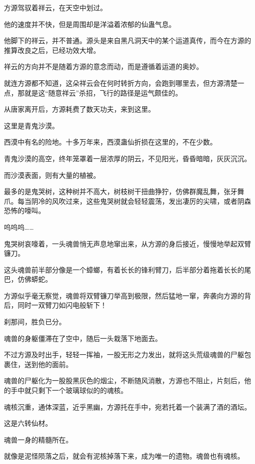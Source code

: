 
\begin{this_body}

方源驾驭着祥云，在天空中划过。

他的速度并不快，但是周围却是洋溢着浓郁的仙蛊气息。

他脚下的祥云，并不普通。源头是来自黑凡洞天中的某个运道真传，而今在方源的推算改良之后，已经功效大增。

祥云的方向并不是随着方源的意念而动，而是遵循着运道的奥妙。

就连方源都不知道，这朵祥云会在何时转折方向，会跑到哪里去，但方源清楚一点，那就是这“随意祥云”杀招，飞行的路径是运气颇佳的。

从唐家离开后，方源耗费了数天功夫，来到这里。

这里是青鬼沙漠。

西漠中有名的险地。十多万年来，西漠蛊仙折损在这里的，不在少数。

青鬼沙漠的高空，终年笼罩着一层浓厚的阴云，不见阳光，昏昏暗暗，灰灰沉沉。

而沙漠表面，则有大量的植被。

最多的是鬼哭树，这种树并不高大，树枝树干扭曲狰狞，仿佛群魔乱舞，张牙舞爪。每当阴冷的风吹过来，这些鬼哭树就会轻轻震荡，发出凄厉的尖啸，或者阴森恐怖的嚎叫。

呜呜呜……

鬼哭树哀嚎着，一头魂兽悄无声息地窜出来，从方源的身后接近，慢慢地举起双臂镰刀。

这头魂兽前半部分像是一个蟑螂，有着长长的锋利臂刀，后半部分着拖着长长的尾巴，仿佛蟒蛇。

方源似乎毫无察觉，魂兽将双臂镰刀举高到极限，然后猛地一窜，奔袭向方源的背后，同时一双臂刀如闪电般斩下！

刹那间，胜负已分。

魂兽的身躯僵滞在了空中，随后一头栽落下地面去。

不过方源及时出手，轻轻一挥袖，一股无形之力发出，就将这头荒级魂兽的尸躯包裹住，送到他的面前。

魂兽的尸躯化为一股股黑灰色的烟尘，不断随风消散，方源也不阻止，片刻后，他的手中就只剩下一个玻璃球似的的魂核。

魂核沉重，通体深蓝，近乎黑幽，方源托在手中，宛若托着一个装满了酒的酒坛。

这是六转仙材。

魂兽一身的精髓所在。

就像是泥怪陨落之后，就会有泥核掉落下来，成为唯一的遗物。魂兽也有魂核。


\end{this_body}
